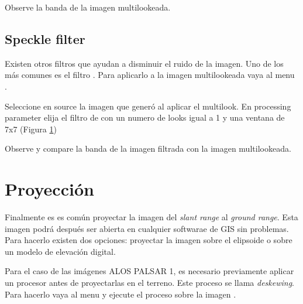 \begin{que}
Observe la banda  de la imagen multilookeada.
\end{que}


\subsection{Speckle filter}

Existen otros filtros que ayudan a disminuir el ruido de la imagen. Uno de los más comunes es el filtro . Para aplicarlo a la imagen multilookeada vaya al menu .

\begin{figure}[h!]
    \centering
    \hfill
    \caption{}
    \label{fig:lee}
\end{figure}

Seleccione en source la imagen  que generó al aplicar el multilook. En processing parameter elija el filtro de  con un numero de looks igual a 1 y una ventana de 7x7 (Figura \ref{fig:lee})



\begin{que}
    Observe y compare la banda  de la imagen filtrada con la imagen multilookeada.
\end{que}

\section{Proyección}

Finalmente es es común proyectar la imagen del \emph{slant range} al \emph{ground range}. Esta imagen podrá después ser abierta en cualquier softwarae de GIS sin problemas. Para hacerlo existen dos opciones: proyectar la imagen sobre el elipsoide o sobre un modelo de elevación digital.

Para el caso de las imágenes ALOS PALSAR 1, es necesario previamente aplicar un procesor antes de proyectarlas en el terreno. Este proceso se llama \emph{deskewing}. Para hacerlo vaya al menu  y ejecute el proceso sobre la imagen .

